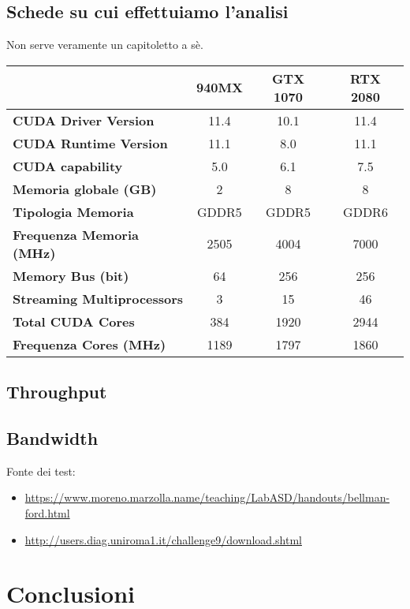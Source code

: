 \documentclass{article}
\begin{document}
	\subsection{Schede su cui effettuiamo l'analisi}
	Non serve veramente un capitoletto a sè.
	\renewcommand{\arraystretch}{1.2}
	\begin{table}[!ht]
		\begin{tabular}{|l|c|c|c|}
			\hline
			\multicolumn{1}{|c|}{\textbf{}} & \textbf{940MX} & \textbf{GTX 1070} & \textbf{RTX 2080} \\ \hline
			\textbf{CUDA Driver Version} & 11.4 & 10.1 & 11.4 \\ \hline
			\textbf{CUDA Runtime Version} & 11.1 & 8.0 & 11.1 \\ \hline
			\textbf{CUDA capability} & 5.0 & 6.1 & 7.5 \\ \hline
			\textbf{Memoria globale (GB)} & 2 & 8 & 8 \\ \hline
			\textbf{Tipologia Memoria} & GDDR5 & GDDR5 & GDDR6 \\ \hline
			\textbf{Frequenza Memoria (MHz)} & 2505 & 4004 & 7000 \\ \hline
			\textbf{Memory Bus (bit)} & 64 & 256 & 256 \\ \hline
			\textbf{Streaming Multiprocessors} & 3 & 15 & 46 \\ \hline
			\textbf{Total CUDA Cores} & 384 & 1920 & 2944 \\ \hline
			\textbf{Frequenza Cores (MHz)} & 1189 & 1797 & 1860 \\ \hline
		\end{tabular}
	\end{table}
	
	\subsection{Throughput}
	\subsection{Bandwidth}
	Fonte dei test:
	\begin{itemize}
		\item \url{https://www.moreno.marzolla.name/teaching/LabASD/handouts/bellman-ford.html}
		\item \url{http://users.diag.uniroma1.it/challenge9/download.shtml}
	\end{itemize}
	
	\section{Conclusioni}
	\label{section:end}
	
	\printbibliography
	
\end{document}
